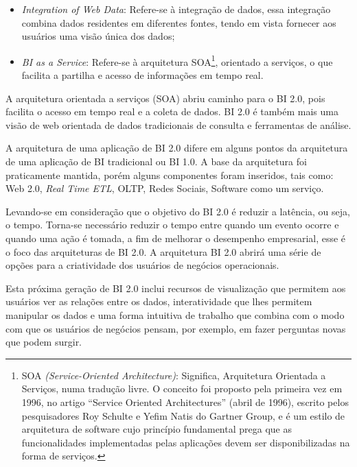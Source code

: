 \begin{itemize}
    \item \textit{Integration of Web Data}: Refere-se \`{a} integra\c{c}\~{a}o de dados, essa integra\c{c}\~{a}o combina dados residentes em diferentes fontes, tendo em vista fornecer aos usu\'{a}rios uma vis\~{a}o única dos dados;
    \item \textit{BI as a Service}: Refere-se \`{a} arquitetura SOA\footnote{SOA \textit{(Service-Oriented Architecture)}: Significa, Arquitetura Orientada a Servi\c{c}os, numa tradu\c{c}\~{a}o livre. O conceito foi proposto pela primeira vez em 1996, no artigo “Service Oriented Architectures” (abril de 1996), escrito pelos pesquisadores Roy Schulte e Yefim Natis do Gartner Group, e \'{e} um estilo de arquitetura de software cujo princ\'{i}pio fundamental prega que as funcionalidades implementadas pelas aplica\c{c}\~{o}es devem ser disponibilizadas na forma de servi\c{c}os.}, orientado a servi\c{c}os, o que facilita a partilha e acesso de informa\c{c}\~{o}es em tempo real.

\end{itemize}

A arquitetura orientada a servi\c{c}os (SOA) abriu caminho para o BI 2.0, pois facilita o acesso em tempo real e a coleta de dados. BI 2.0 \'{e} tamb\'{e}m mais uma vis\~{a}o de web orientada de dados tradicionais de consulta e ferramentas de an\'{a}lise.

A arquitetura de uma aplica\c{c}\~{a}o de BI 2.0 difere em alguns pontos da arquitetura de uma aplica\c{c}\~{a}o de BI tradicional ou BI 1.0. A base da arquitetura foi praticamente mantida, por\'{e}m alguns componentes foram inseridos, tais como: Web 2.0, \textit{Real Time ETL}, OLTP, Redes Sociais, Software como um servi\c{c}o.

Levando-se em considera\c{c}\~{a}o que o objetivo do BI 2.0 \'{e} reduzir a lat\^{e}ncia, ou seja, o tempo. Torna-se necess\'{a}rio reduzir o tempo entre quando um evento ocorre e quando uma a\c{c}\~{a}o \'{e} tomada, a fim de melhorar o desempenho empresarial, esse \'{e} o foco das arquiteturas de BI 2.0. A arquitetura BI 2.0 abrir\'{a} uma s\'{e}rie de op\c{c}\~{o}es para a criatividade dos usu\'{a}rios de neg\'{o}cios operacionais. 

Esta pr\'{o}xima gera\c{c}\~{a}o de BI 2.0 inclui recursos de visualiza\c{c}\~{a}o que permitem aos usu\'{a}rios ver as rela\c{c}\~{o}es entre os dados, interatividade que lhes permitem manipular os dados e uma forma intuitiva de trabalho que combina com o modo com que os usu\'{a}rios de neg\'{o}cios pensam, por exemplo, em fazer perguntas novas que podem surgir. 

